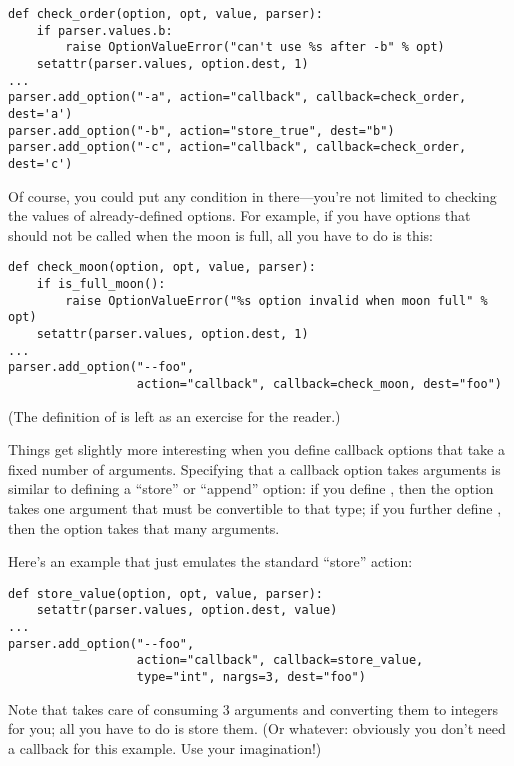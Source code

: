\begin{verbatim}
def check_order(option, opt, value, parser):
    if parser.values.b:
        raise OptionValueError("can't use %s after -b" % opt)
    setattr(parser.values, option.dest, 1)
...
parser.add_option("-a", action="callback", callback=check_order, dest='a')
parser.add_option("-b", action="store_true", dest="b")
parser.add_option("-c", action="callback", callback=check_order, dest='c')
\end{verbatim}

Of course, you could put any condition in there---you're not limited
to checking the values of already-defined options.  For example, if
you have options that should not be called when the moon is full, all
you have to do is this:

\begin{verbatim}
def check_moon(option, opt, value, parser):
    if is_full_moon():
        raise OptionValueError("%s option invalid when moon full" % opt)
    setattr(parser.values, option.dest, 1)
...
parser.add_option("--foo",
                  action="callback", callback=check_moon, dest="foo")
\end{verbatim}

(The definition of  is left as an exercise for the
reader.)


Things get slightly more interesting when you define callback options
that take a fixed number of arguments.  Specifying that a callback
option takes arguments is similar to defining a ``store'' or
``append'' option: if you define , then the option takes one
argument that must be convertible to that type; if you further define
, then the option takes that many arguments.

Here's an example that just emulates the standard ``store'' action:

\begin{verbatim}
def store_value(option, opt, value, parser):
    setattr(parser.values, option.dest, value)
...
parser.add_option("--foo",
                  action="callback", callback=store_value,
                  type="int", nargs=3, dest="foo")
\end{verbatim}

Note that  takes care of consuming 3 arguments and
converting them to integers for you; all you have to do is store them.
(Or whatever: obviously you don't need a callback for this example.
Use your imagination!)

